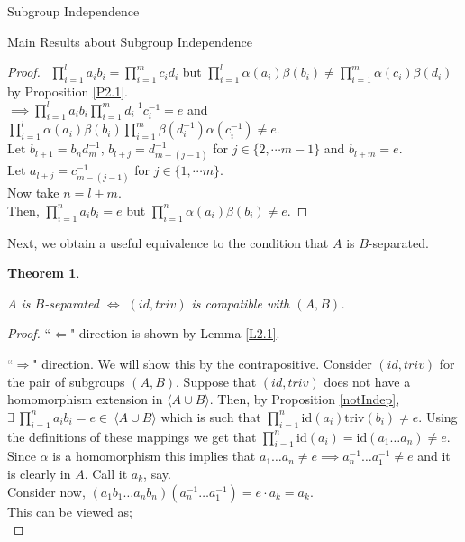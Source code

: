\documentclass{article}
\newtheorem{theorem}{Theorem}[section]
\begin{document}
\begin{section}{Subgroup Independence}
\begin{subsection}{Main Results about Subgroup Independence}
\begin{proof}
				$\ \ \prod_{i = 1}^{l} a_ib_i  = \prod_{i = 1}^{m} c_id_i $ but  $\prod_{i = 1}^{l} \alpha(a_i)\beta(b_i) \not= \prod_{i = 1}^{m} \alpha(c_i)\beta(d_i) $ by Proposition \ref{P2.1}.  \\ $ \implies \prod_{i = 1}^{l} a_ib_i \prod_{i = 1}^{m} d_i^{-1}c_i^{-1} = e$ and  $ \prod_{i = 1}^{l} \alpha(a_i)\beta(b_i)\prod_{i = 1}^{m} \beta(d_i^{-1})\alpha(c_i^{-1})  \not = e$.\\
				
				\noindent Let $b_{l+1} = b_nd_m^{-1}$, $b_{l+j} = d_{m-(j-1)}^{-1}$ for $j \in \{2, \cdots m-1\}$ and $b_{l+m} = e$. \\
				Let  $a_{l+j} =  c_{m-(j-1)}^{-1}$ for $j \in \{1, \cdots m\}$.\\
				Now take $n= l+m$.\\
				
				\noindent Then, $\prod_{i=1}^{n}a_ib_i= e$ but $\prod_{i = 1}^{n} \alpha(a_i)\beta(b_i) \not= e$.
			\end{proof}
			
			\noindent Next, we obtain a useful equivalence to the condition that $A$ is $B$-separated.
			
			\begin{theorem} \label{T2.2}  
				
				$A$ is $B$-separated $\iff$ $(id, triv)$  is compatible with $(A, B)$.
				
				
			\end{theorem}	
			
			\begin{proof} ``$\Leftarrow$" direction is shown by Lemma \ref{L2.1}.
				
				``$\Rightarrow$" direction. We will show this by the contrapositive. Consider $(id, triv)$ for the pair of subgroups $(A, B)$. Suppose that $(id, triv)$ does not have a homomorphism extension in $\langle A \cup B\rangle .$ Then, by Proposition \ref{notIndep}, $\exists \ \prod_{i = 1}^{n} a_ib_i 
				= e \in \  \langle A \cup B\rangle $ which is such that $\prod_{i = 1}^{n} \text{id}(a_i)\text{triv}(b_i) \not = e$. Using the definitions of these mappings we get that $\prod_{i = 1}^{n}\text{id}(a_i)  = \text{id}(a_1 \dots a_n) \not= e$. Since $\alpha$ is a homomorphism this implies that $a_1 \dots a_n \not= e \implies a_n^{-1} \dots a_1^{-1} \not= e $ and it is clearly in $A$. Call it $a_k$, say.  \\
				
				\noindent Consider now, $ (a_1b_1 \dots a_nb_n)(a_n^{-1} \dots a_1^{-1}) = e \cdot a_k = a_k$.\\ This can be viewed as;\\
				

\end{proof}
\end{subsection}
\end{section}
\end{document}
